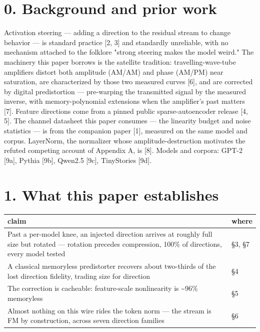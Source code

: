 \documentclass[10pt]{article}
\begin{document}
\section{0. Background and prior work}

Activation steering --- adding a direction to the residual stream to change behavior --- is standard
practice [2, 3] and standardly unreliable, with no mechanism attached to the folklore "strong
steering makes the model weird." The machinery this paper borrows is the satellite tradition:
travelling-wave-tube amplifiers distort both amplitude (AM/AM) and phase (AM/PM) near saturation,
are characterized by those two measured curves [6], and are corrected by digital predistortion ---
pre-warping the transmitted signal by the measured inverse, with memory-polynomial extensions when
the amplifier's past matters [7]. Feature directions come from a pinned public sparse-autoencoder
release [4, 5]. The channel datasheet this paper consumes --- the linearity budget and noise
statistics --- is from the companion paper [1], measured on the same model and corpus. LayerNorm, the
normalizer whose amplitude-destruction motivates the refuted competing account of Appendix A, is
[8]. Models and corpora: GPT-2 [9a], Pythia [9b], Qwen2.5 [9c], TinyStories [9d].

\section{1. What this paper establishes}

\begin{center}\small\begin{tabular}{ll}
\toprule
claim & where \\
\midrule
\parbox[t]{0.46\linewidth}{Past a per-model knee, an injected direction arrives at roughly full size but rotated --- rotation precedes compression, 100\% of directions, every model tested} & §3, §7 \\
\parbox[t]{0.46\linewidth}{A classical memoryless predistorter recovers about two-thirds of the lost direction fidelity, trading size for direction} & §4 \\
\parbox[t]{0.46\linewidth}{The correction is cacheable: feature-scale nonlinearity is \textasciitilde{}96\% memoryless} & §5 \\
\parbox[t]{0.46\linewidth}{Almost nothing on this wire rides the token norm --- the stream is FM by construction, across seven direction families} & §6 \\
\bottomrule
\end{tabular}\end{center}
\end{document}
